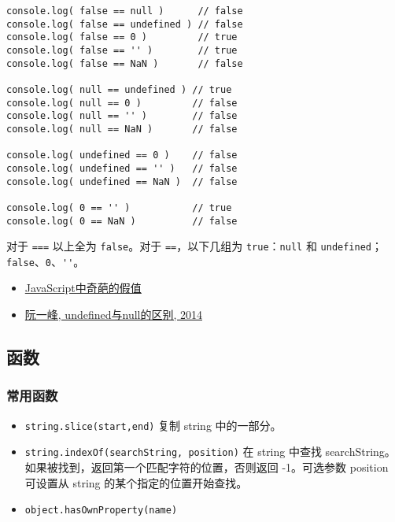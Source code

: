 \begin{lstlisting}
console.log( false == null )      // false
console.log( false == undefined ) // false
console.log( false == 0 )         // true
console.log( false == '' )        // true
console.log( false == NaN )       // false

console.log( null == undefined ) // true
console.log( null == 0 )         // false
console.log( null == '' )        // false
console.log( null == NaN )       // false

console.log( undefined == 0 )    // false
console.log( undefined == '' )   // false
console.log( undefined == NaN )  // false

console.log( 0 == '' )           // true
console.log( 0 == NaN )          // false
\end{lstlisting}

对于 \lstinline!===! 以上全为 \lstinline!false!。对于
\lstinline!==!，以下几组为 \lstinline!true!：\lstinline!null! 和
\lstinline!undefined!；\lstinline!false!、\lstinline!0!、\lstinline!''!。

\begin{itemize}
\tightlist
\item
  \href{http://www.cnblogs.com/snandy/p/3589517.html}{JavaScript中奇葩的假值}
\item
  \href{http://www.ruanyifeng.com/blog/2014/03/undefined-vs-null.html}{阮一峰,
  undefined与null的区别, 2014}
\end{itemize}

\subsection{函数}\label{ux51fdux6570}

\subsubsection{常用函数}\label{ux5e38ux7528ux51fdux6570}

\begin{itemize}
\tightlist
\item
  \lstinline!string.slice(start,end)! 复制 string 中的一部分。
\item
  \lstinline!string.indexOf(searchString, position)! 在 string 中查找
  searchString。如果被找到，返回第一个匹配字符的位置，否则返回
  -1。可选参数 position 可设置从 string 的某个指定的位置开始查找。
\item
  \lstinline!object.hasOwnProperty(name)!
\end{itemize}

